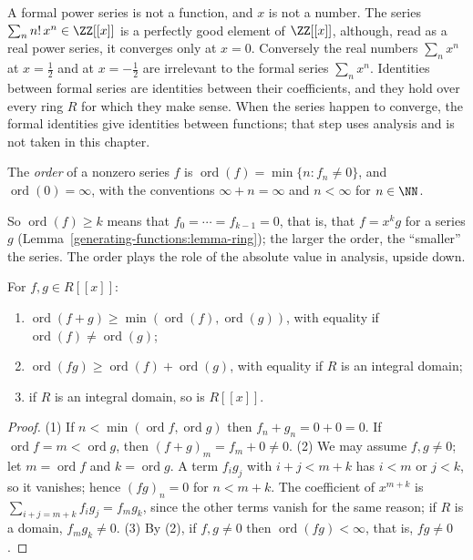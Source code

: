 \begin{remark}\label{generating-functions:remark-formal}
A formal power series is not a function, and $x$ is not a number. The series $\sum_nn!\,x^n \in \ZZ[[x]]$ is a perfectly good element of $\ZZ[[x]]$, although, read as a real power series, it
converges only at $x = 0$. Conversely the real numbers $\sum_nx^n$ at $x = \frac12$ and at $x = -\frac12$ are irrelevant to the formal series $\sum_nx^n$. Identities between formal series are
identities between their coefficients, and they hold over every ring $R$ for which they make sense. When the series happen to converge, the formal identities give identities between functions; that
step uses analysis and is not taken in this chapter.
\end{remark}

\begin{definition}\label{generating-functions:definition-order}
The \emph{order} of a nonzero series $f$ is $\operatorname{ord}(f) = \min\{n : f_n \neq 0\}$, and $\operatorname{ord}(0) = \infty$, with the conventions $\infty + n = \infty$ and $n < \infty$
for $n \in \NN$.
\end{definition}

So $\operatorname{ord}(f) \geq k$ means that $f_0 = \cdots = f_{k-1} = 0$, that is, that $f = x^kg$ for a series $g$ (Lemma~\ref{generating-functions:lemma-ring}); the larger the order, the
``smaller'' the series. The order plays the role of the absolute value in analysis, upside down.

\begin{lemma}\label{generating-functions:lemma-order}
For $f, g \in R[[x]]$:
\begin{enumerate}
\item $\operatorname{ord}(f + g) \geq \min(\operatorname{ord}(f), \operatorname{ord}(g))$, with equality if $\operatorname{ord}(f) \neq \operatorname{ord}(g)$;
\item $\operatorname{ord}(fg) \geq \operatorname{ord}(f) + \operatorname{ord}(g)$, with equality if $R$ is an integral domain;
\item if $R$ is an integral domain, so is $R[[x]]$.
\end{enumerate}
\end{lemma}

\begin{proof}
(1) If $n < \min(\operatorname{ord} f, \operatorname{ord} g)$ then $f_n + g_n = 0 + 0 = 0$. If $\operatorname{ord} f = m < \operatorname{ord} g$, then $(f + g)_m = f_m + 0 \neq 0$.
(2) We may assume $f, g \neq 0$; let $m = \operatorname{ord} f$ and $k = \operatorname{ord} g$. A term $f_ig_j$ with $i + j < m + k$ has $i < m$ or $j < k$, so it vanishes; hence $(fg)_n = 0$ for
$n < m + k$. The coefficient of $x^{m+k}$ is $\sum_{i+j=m+k}f_ig_j = f_mg_k$, since the other terms vanish for the same reason; if $R$ is a domain, $f_mg_k \neq 0$.
(3) By (2), if $f, g \neq 0$ then $\operatorname{ord}(fg) < \infty$, that is, $fg \neq 0$.
\end{proof}

